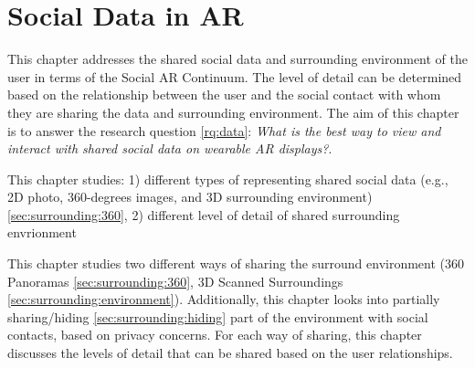 \chapter{Social Data in AR} 
\label{ch:data} 

This chapter addresses the shared social data and surrounding environment of the user in terms of the Social AR Continuum. The level of detail can be determined based on the relationship between the user and the social contact with whom they are sharing the data and surrounding environment. The aim of this chapter is to answer the research question \ref{rq:data}: \textit{What is the best way to view and interact with shared social data on wearable AR displays?}. 


This chapter studies: 1) different types of representing shared social data (e.g., 2D photo, 360-degrees images, and 3D surrounding environment) \ref{sec:surrounding:360}, 2) different level of detail of shared surrounding envrionment

This chapter studies two different ways of sharing the surround environment (360 Panoramas \ref{sec:surrounding:360}, 3D Scanned Surroundings \ref{sec:surrounding:environment}). Additionally, this chapter looks into partially sharing/hiding \ref{sec:surrounding:hiding} part of the environment with social contacts, based on privacy concerns. For each way of sharing, this chapter discusses the levels of detail that can be shared based on the user relationships. 





